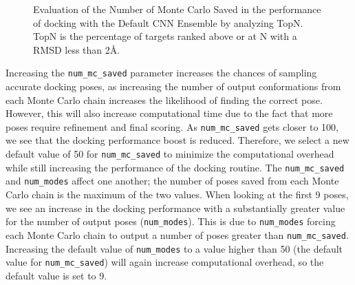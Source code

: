 \documentclass[linenumbers,doublespacing]{bmcart}
\begin{document}
\begin{figure}[tb]
	\caption{Evaluation of the Number of Monte Carlo Saved in the performance of docking with the Default CNN Ensemble by analyzing TopN. TopN is the percentage of targets ranked above or at N with a RMSD less than 2{\AA}.}
	\label{fig:mcsaved}
\end{figure}    

Increasing the \texttt{num\_mc\_saved} parameter increases the chances of sampling accurate docking poses, as increasing the number of output conformations from each Monte Carlo chain increases the likelihood of finding the correct pose. However, this will also increase computational time due to the fact that more poses require refinement and final scoring. As \texttt{num\_mc\_saved} gets closer to 100, we see that the docking performance boost is reduced. Therefore, we select a new default value of 50 for \texttt{num\_mc\_saved} to minimize the computational overhead while still increasing the performance of the docking routine. The \texttt{num\_mc\_saved} and \texttt{num\_modes} affect one another; the number of poses saved from each Monte Carlo chain is the maximum of the two values. When looking at the first 9 poses, we see an increase in the docking performance with a substantially greater value for the number of output poses (\texttt{num\_modes}). This is due to \texttt{num\_modes} forcing each Monte Carlo chain to output a number of poses greater than \texttt{num\_mc\_saved}. Increasing the default value of \texttt{num\_modes} to a value higher than 50 (the default value for \texttt{num\_mc\_saved}) will again increase computational overhead, so the default value is set to 9. 
\end{document}
